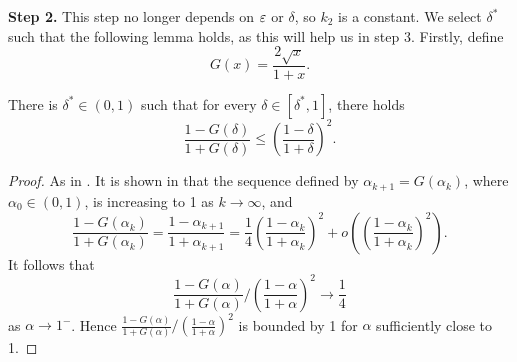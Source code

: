 


\textbf{Step 2.} This step no longer depends on $\varepsilon$ or $\delta$, so $k_2$ is a constant. We select $\delta^*$ such that the following lemma holds, as this will help us in step 3. Firstly, define 
\[G(x)=\frac{2\sqrt{x}}{1+x}.\] 

\begin{lemma}\label{hh}
There is $\delta^*\in(0,1)$ such that for every $\delta \in [\delta^*,1]$, there holds
\[\dfrac{1-G(\delta)}{1+G(\delta)}\leq \left(\dfrac{1-\delta}{1+\delta}\right)^2.\]
\end{lemma}

\begin{proof}
As in \cite[Lemma 4.1]{Yuji}. It is shown in \cite[Theorem 3.2]{Gawlik} that the sequence defined by $\alpha_{k+1}=G(\alpha_k)$, where $\alpha_0 \in (0,1)$, is increasing to 1 as $k\to\infty$, and
\[\dfrac{1-G(\alpha_k)}{1+G(\alpha_k)}=\dfrac{1-\alpha_{k+1}}{1+\alpha_{k+1}}=\dfrac{1}{4}\left(\dfrac{1-\alpha_k}{1+\alpha_k}\right)^2+o\left(\left(\dfrac{1-\alpha_k}{1+\alpha_k}\right)^2\right).\]
It follows that
\[\dfrac{1-G(\alpha)}{1+G(\alpha)}\bigg/ \left(\dfrac{1-\alpha}{1+\alpha}\right)^2 \to \dfrac{1}{4}\]
as $\alpha \to 1^-$. Hence $\frac{1-G(\alpha)}{1+G(\alpha)}\big/ \left(\frac{1-\alpha}{1+\alpha}\right)^2$ is bounded by 1 for $\alpha$ sufficiently close to 1.
\end{proof}

